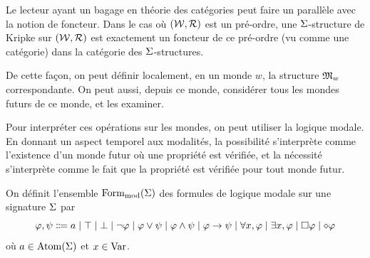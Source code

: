\begin{remark}
  Le lecteur ayant un bagage en théorie des catégories peut faire un parallèle
  avec la notion de foncteur. Dans le cas où $(\mathcal{W},\mathrel{\mathcal{R}})$ est un pré-ordre,
  une $\Sigma$-structure de Kripke sur $(\mathcal{W},\mathrel{\mathcal{R}})$ est exactement un
  foncteur de ce pré-ordre (vu comme une catégorie) dans la catégorie des
  $\Sigma$-structures.
\end{remark}

De cette façon, on peut définir localement, en un monde $w$, la structure
$\mathfrak{M}_w$ correspondante. On peut aussi, depuis ce monde, considérer tous
les mondes futurs de ce monde, et les examiner.

Pour interpréter ces opérations sur les mondes, on peut utiliser la logique
modale. En donnant un aspect temporel aux modalités, la possibilité s'interprète
comme l'existence d'un monde futur où une propriété est vérifiée, et la
nécessité s'interprète comme le fait que la propriété est vérifiée pour tout
monde futur.

\begin{definition}
  On définit l'ensemble $\operatorname{Form}_{\mathrm{mod}}(\Sigma)$ des formules de logique modale sur
  une signature $\Sigma$ par
  \[\varFF,\varFP \inddefeq
  a\mid \top\mid\bot\mid\lnot\varFF\mid\varFF\lor\varFP
  \mid\varFF\land\varFP\mid\varFF\to\varFP\mid\forall x,\varFF\mid
  \exists x, \varFF\mid \modSq\varFF\mid\modDia\varFF\]
  où $a \in \operatorname{Atom}(\Sigma)$ et $x \in \operatorname{Var}$.
  \index[notation]{$\modDia$}
\end{definition}

